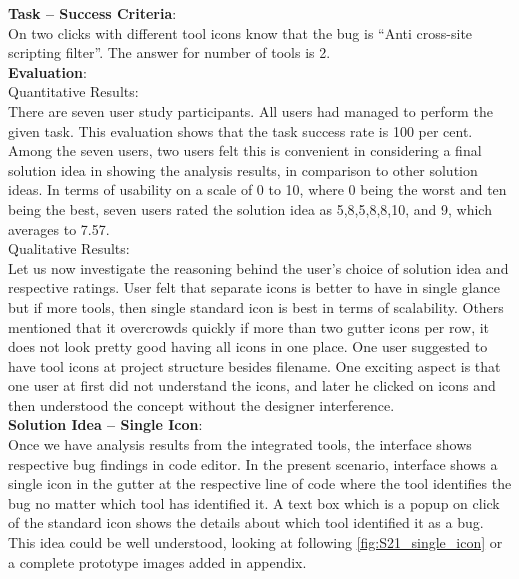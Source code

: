 \textbf{Task – Success Criteria}: \\

On two clicks with different tool icons know that the bug is “Anti cross-site scripting filter”. The answer for number of tools is 2. \\

\textbf{Evaluation}: \\

Quantitative Results: \\

There are seven user study participants. All users had managed to perform the given task. This evaluation shows that the task success rate is 100 per cent. \\

Among the seven users, two users felt this is convenient in considering a final solution idea in showing the analysis results, in comparison to other solution ideas. In terms of usability on a scale of 0 to 10, where 0 being the worst and ten being the best, seven users rated the solution idea as 5,8,5,8,8,10, and 9, which averages to 7.57. \\

Qualitative Results: \\

Let us now investigate the reasoning behind the user’s choice of solution idea and respective ratings. User felt that separate icons is better to have in single glance but if more tools, then single standard icon is best in terms of scalability. Others mentioned that it overcrowds quickly if more than two gutter icons per row, it does not look pretty good having all icons in one place. One user suggested to have tool icons at project structure besides filename. One exciting aspect is that one user at first did not understand the icons, and later he clicked on icons and then understood the concept without the designer interference. \\

\textbf{Solution Idea – Single Icon}: \\

Once we have analysis results from the integrated tools, the interface shows respective bug findings in code editor. In the present scenario, interface shows a single icon in the gutter at the respective line of code where the tool identifies the bug no matter which tool has identified it. A text box which is a popup on click of the standard icon shows the details about which tool identified it as a bug. This idea could be well understood, looking at following \autoref{fig:S21_single_icon} or a complete prototype images added in appendix. \\


